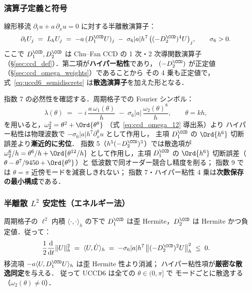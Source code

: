 \subsubsection{演算子定義と符号}
\label{sec:uccd6_hyperviscosity}

線形移流 $\partial_t u + a\,\partial_x u = 0$ に対する半離散演算子：
\begin{equation}
  \partial_t U_j
  \;=\; L_h U_j
  \;=\; -a\,(D_1^{\CCD}U)_j \;-\; \sigma_6|a|h^{7}\,\bigl((-D_2^{\CCD})^{4}U\bigr)_j,
  \qquad \sigma_6 > 0.
  \label{eq:uccd6_semidiscrete}
\end{equation}
ここで $D_1^{\CCD}, D_2^{\CCD}$ は Chu--Fan CCD の 1 次・2 次導関数演算子
（§\ref{sec:ccd_def}）．第二項が\textbf{ハイパー粘性}であり，
$(-D_2^{\CCD})$ が正定値（§\ref{sec:ccd_omega_weights}）であることから
その 4 乗も正定値で，式~\eqref{eq:uccd6_semidiscrete} は\textbf{散逸演算子}を加えた形となる．

指数 7 の必然性を確認する．周期格子での Fourier シンボル：
\begin{equation}
  \lambda(\theta)
  \;=\; -i\,\frac{a\,\omega_1(\theta)}{h}
  \;-\; \sigma_6|a|\,\frac{\omega_2(\theta)^{8}}{h},
  \qquad \theta = kh,
  \label{eq:uccd6_symbol}
\end{equation}
を用いると，$\omega_2^2 = \theta^2 + \Ord{\theta^8}$
（式~\eqref{eq:ccd_omega_12} 導出系）より
ハイパー粘性は物理波数で
$-\sigma_6|a|h^{7}\partial_x^{8}u$ として作用し，
主項 $D_1^{\CCD}$ の $\Ord{h^6}$ 切断誤差より\textbf{漸近的に劣位}．
指数 5（$h^{5}(-D_2^{\CCD})^3$）では散逸項が $\omega_2^6/h = \theta^6/h + \Ord{\theta^{12}/h}$
として作用し，主項 $D_1^{\CCD}$ の $\Ord{h^6}$ 切断誤差（$\theta - \theta^7/9450 + \Ord{\theta^9}$）と
低波数で同オーダー競合し精度を削る；
指数 9 では $\theta=\pi$ 近傍モードを減衰しきれない；
指数 7・ハイパー粘性 4 乗は\textbf{次数保存の最小構成}である．

\subsubsection{半離散 $L^2$ 安定性（エネルギー法）}
\label{sec:uccd6_l2_stability}

周期格子の $\ell^2$ 内積 $\langle\cdot,\cdot\rangle_h$ の下で
$D_1^{\CCD}$ は歪 Hermite，$D_2^{\CCD}$ は Hermite かつ負定値．従って：
\begin{equation}
  \frac{1}{2}\frac{\mathrm{d}}{\mathrm{d}t}\|U\|_h^{2}
  \;=\; \langle U, \dot U\rangle_h
  \;=\; -\sigma_6|a|h^{7}\,\bigl\|(-D_2^{\CCD})^{2}U\bigr\|_h^{2}
  \;\le\; 0.
  \label{eq:uccd6_energy_id}
\end{equation}
移流項 $-a\langle U, D_1^{\CCD}U\rangle_h$ は歪 Hermite 性より消滅；
ハイパー粘性項が\textbf{厳密な散逸同定}を与える．
従って UCCD6 は全ての $\theta\in(0,\pi]$ で
モードごとに散逸する（$\omega_2(\theta)\ne 0$）．

